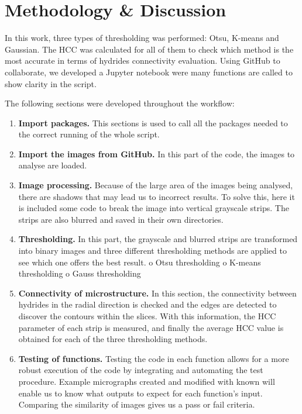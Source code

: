 \section{Methodology \& Discussion}

In this work, three types of thresholding was performed: Otsu, K-means and Gaussian. The HCC was calculated for all of them to check which method is the most accurate in terms of hydrides connectivity evaluation. Using GitHub to collaborate, we developed a Jupyter notebook were many functions are called to show clarity in the script.

The following sections were developed throughout the workflow:

\begin{enumerate}

    \item \textbf{Import packages.}
This sections is used to call all the packages needed to the correct running of the whole script.

    \item\textbf{ Import the images from GitHub.}
In this part of the code, the images to analyse are loaded.

    \item \textbf{Image processing.}
Because of the large area of the images being analysed, there are shadows that may lead us to incorrect results. To solve this, here it is included some code to break the image into vertical grayscale strips. The strips are also blurred and saved in their own directories.

    \item \textbf{Thresholding.}
In this part, the grayscale and blurred strips are transformed into binary images and three different thresholding methods are applied to see which one offers the best result.
o	Otsu thresholding
o	K-means thresholding
o	Gauss thresholding

    \item \textbf{Connectivity of microstructure.}
In this section, the connectivity between hydrides in the radial direction is checked and the edges are detected to discover the contours within the slices. With this information, the HCC parameter of each strip is measured, and finally the average HCC value is obtained for each of the three thresholding methods.

    \item \textbf{Testing of functions.}
Testing the code in each function allows for a more robust execution of the code by integrating and automating the test procedure. Example micrographs created and modified with known will enable us to know what outputs to expect for each function's input. Comparing the similarity of images gives us a pass or fail criteria.\par


\end{enumerate}
